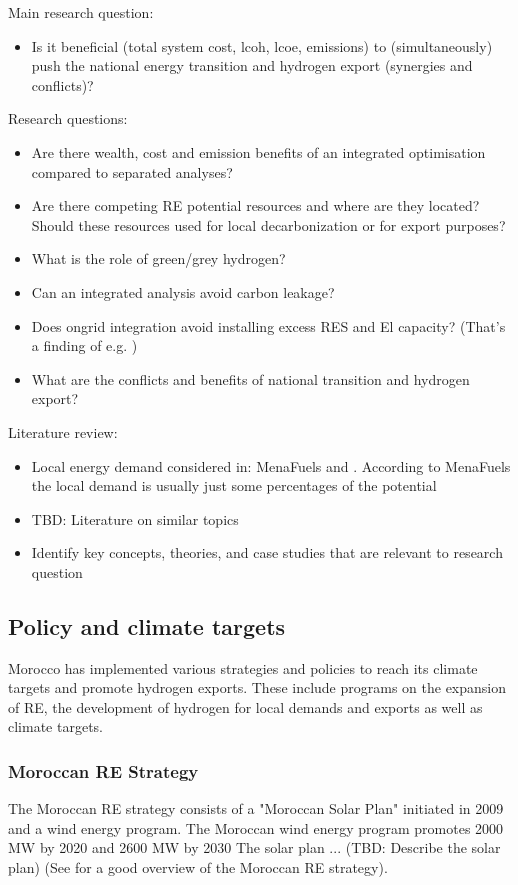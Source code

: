 Main research question:
\begin{itemize}
    \item Is it beneficial (total system cost, lcoh, lcoe, emissions) to (simultaneously) push the national energy transition and hydrogen export (synergies and conflicts)?   
\end{itemize}

Research questions:
\begin{itemize}
    \item Are there wealth, cost and emission benefits of an integrated optimisation compared to separated analyses?
    \item Are there competing RE potential resources and where are they located? Should these resources used for local decarbonization or for export purposes?
    \item What is the role of green/grey hydrogen?   
    \item Can an integrated analysis avoid carbon leakage?
    \item Does ongrid integration avoid installing excess RES and El capacity? (That's a finding of e.g. \cite{Ruhnau2022})
    \item What are the conflicts and benefits of national transition and hydrogen export?
\end{itemize}

Literature review:
\begin{itemize}
    \item Local energy demand considered in: MenaFuels and \cite{Hampp2021}. According to MenaFuels the local demand is usually just some percentages of the potential
    \item TBD: Literature on similar topics 
    \item Identify key concepts, theories, and case studies that are relevant to research question
\end{itemize}


\subsection{Policy and climate targets}
\label{subsec:policyandtargets}
Morocco has implemented various strategies and policies to reach its climate targets and promote hydrogen exports. 
These include programs on the expansion of RE, the development of hydrogen for local demands and exports as well as climate targets.

\subsubsection{Moroccan RE Strategy}
The Moroccan RE strategy consists of a "Moroccan Solar Plan" initiated in 2009 \cite[p. 2]{Boulakhbar2020}
and a wind energy program.
The Moroccan wind energy program promotes 2000 MW by 2020 and 2600 MW by 2030 \cite[p. 4]{Boulakhbar2020}
The solar plan ... (TBD: Describe the solar plan)
(See \cite[p. 13]{Ersoy2022} for a good overview of the Moroccan RE strategy).

